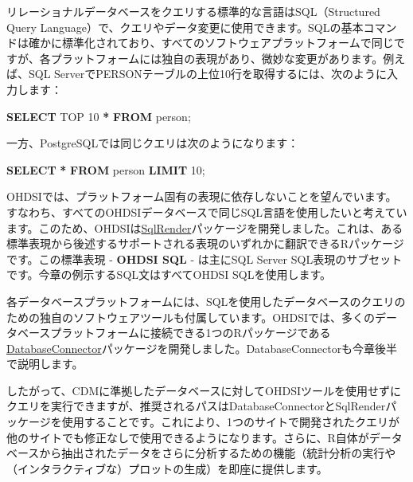 \documentclass[
  11pt]{book}
\newenvironment{Shaded}{\begin{snugshade}}{\end{snugshade}}
\newcommand{\DecValTok}[1]{\textcolor[rgb]{0.00,0.00,0.81}{#1}}
\newcommand{\KeywordTok}[1]{\textcolor[rgb]{0.13,0.29,0.53}{\textbf{#1}}}
\newcommand{\NormalTok}[1]{#1}
\newcommand{\OperatorTok}[1]{\textcolor[rgb]{0.81,0.36,0.00}{\textbf{#1}}}
\theoremstyle{definition}
\theoremstyle{definition}
\theoremstyle{definition}
\theoremstyle{definition}
\theoremstyle{remark}
\begin{document}
リレーショナルデータベースをクエリする標準的な言語はSQL（Structured Query Language）で、クエリやデータ変更に使用できます。SQLの基本コマンドは確かに標準化されており、すべてのソフトウェアプラットフォームで同じですが、各プラットフォームには独自の表現があり、微妙な変更があります。例えば、SQL ServerでPERSONテーブルの上位10行を取得するには、次のように入力します：  

\begin{Shaded}
\begin{Highlighting}[]
\KeywordTok{SELECT}\NormalTok{ TOP }\DecValTok{10} \OperatorTok{*} \KeywordTok{FROM}\NormalTok{ person;}
\end{Highlighting}
\end{Shaded}

一方、PostgreSQLでは同じクエリは次のようになります：

\begin{Shaded}
\begin{Highlighting}[]
\KeywordTok{SELECT} \OperatorTok{*} \KeywordTok{FROM}\NormalTok{ person }\KeywordTok{LIMIT} \DecValTok{10}\NormalTok{;}
\end{Highlighting}
\end{Shaded}

OHDSIでは、プラットフォーム固有の表現に依存しないことを望んでいます。すなわち、すべてのOHDSIデータベースで同じSQL言語を使用したいと考えています。このため、OHDSIは\href{https://ohdsi.github.io/SqlRender/}{SqlRender}パッケージを開発しました。これは、ある標準表現から後述するサポートされる表現のいずれかに翻訳できるRパッケージです。この標準表現 - \textbf{OHDSI SQL} - は主にSQL Server SQL表現のサブセットです。今章の例示するSQL文はすべてOHDSI SQLを使用します。    

各データベースプラットフォームには、SQLを使用したデータベースのクエリのための独自のソフトウェアツールも付属しています。OHDSIでは、多くのデータベースプラットフォームに接続できる1つのRパッケージである\href{https://ohdsi.github.io/DatabaseConnector/}{DatabaseConnector}パッケージを開発しました。DatabaseConnectorも今章後半で説明します。 

したがって、CDMに準拠したデータベースに対してOHDSIツールを使用せずにクエリを実行できますが、推奨されるパスはDatabaseConnectorとSqlRenderパッケージを使用することです。これにより、1つのサイトで開発されたクエリが他のサイトでも修正なしで使用できるようになります。さらに、R自体がデータベースから抽出されたデータをさらに分析するための機能（統計分析の実行や（インタラクティブな）プロットの生成）を即座に提供します。 
\end{document}
